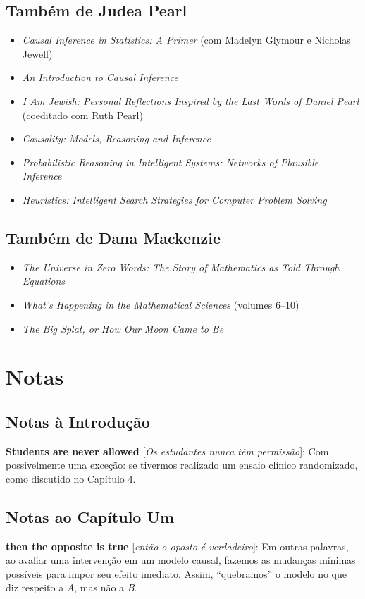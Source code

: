 \documentclass[11pt,a5paper,twoside]{book}
\begin{document}
\section{Também de Judea Pearl}
\begin{itemize}
\item \textit{Causal Inference in Statistics: A Primer} (com Madelyn Glymour e Nicholas Jewell)
\item \textit{An Introduction to Causal Inference}
\item \textit{I Am Jewish: Personal Reflections Inspired by the Last Words of Daniel Pearl} (coeditado com Ruth Pearl)
\item \textit{Causality: Models, Reasoning and Inference}
\item \textit{Probabilistic Reasoning in Intelligent Systems: Networks of Plausible Inference}
\item \textit{Heuristics: Intelligent Search Strategies for Computer Problem Solving}
\end{itemize}
\section{Também de Dana Mackenzie}
\begin{itemize}
\item \textit{The Universe in Zero Words: The Story of Mathematics as Told Through Equations}
\item \textit{What’s Happening in the Mathematical Sciences} (volumes 6–10)
\item \textit{The Big Splat, or How Our Moon Came to Be}
\end{itemize}
\chapter{Notas}
\section{Notas à Introdução}
\textbf{Students are never allowed} [\textit{Os estudantes nunca têm permissão}]: Com possivelmente uma exceção: se tivermos realizado um ensaio clínico randomizado, como discutido no Capítulo 4.

\section{Notas ao Capítulo Um}
\textbf{then the opposite is true} [\textit{então o oposto é verdadeiro}]: Em outras palavras, ao avaliar uma intervenção em um modelo causal, fazemos as mudanças mínimas possíveis para impor seu efeito imediato. Assim, “quebramos” o modelo no que diz respeito a \textit{A}, mas não a \textit{B}.
\end{document}
